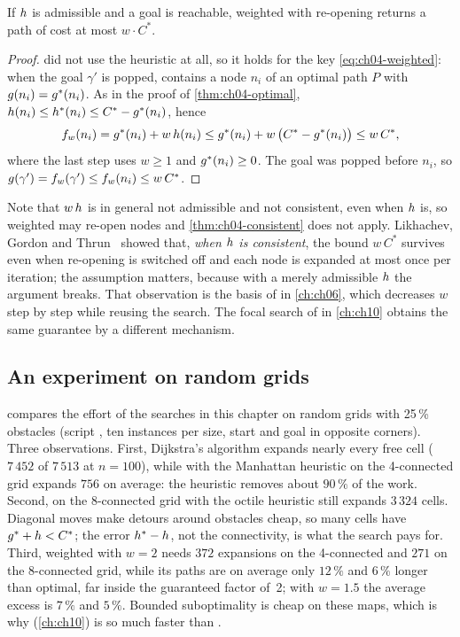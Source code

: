 \begin{theorem}
\label{thm:ch04-weighted}
If $h$ is admissible and a goal is reachable, weighted \astar with
re-opening returns a path of cost at most $w \cdot C^*$.
\end{theorem}
\begin{proof}
 did not use the heuristic at all, so it holds for
the key \cref{eq:ch04-weighted}: when the goal $\gamma'$ is popped, \Open
contains a node $n_i$ of an optimal path $P$ with $g(n_i) =
g^*(n_i)$. As in the proof of \cref{thm:ch04-optimal},
$h(n_i) \le h^*(n_i) \le C^* - g^*(n_i)$, hence
\[
  f_w(n_i) = g^*(n_i) + w\,h(n_i)
    \le g^*(n_i) + w\,\bigl(C^* - g^*(n_i)\bigr)
    \le w\,C^*,
\]
where the last step uses $w \ge 1$ and $g^*(n_i) \ge 0$. The goal was
popped before $n_i$, so $g(\gamma') = f_w(\gamma') \le f_w(n_i)
\le w\,C^*$.
\end{proof}

Note that $w\,h$ is in general not admissible and not consistent, even
when $h$ is, so weighted \astar may re-open nodes and \cref{thm:ch04-consistent}
does not apply. Likhachev, Gordon and Thrun~\cite{likhachev2003ara} showed
that, \emph{when $h$ is consistent}, the bound $w\,C^*$ survives even
when re-opening is switched off and each node is expanded at most once per
iteration; the assumption matters, because with a merely admissible $h$
the argument breaks. That observation is the basis of \arastar in \cref{ch:ch06}, which decreases
$w$ step by step while reusing the search. The focal search of \ecbs in
\cref{ch:ch10} obtains the same guarantee by a different mechanism.

\subsection{An experiment on random grids}
\label{sec:ch04-experiment}

 compares the effort of the searches in this chapter on
random grids with 25\,\% obstacles (script ,
ten instances per size, start and goal in opposite corners). Three
observations. First, Dijkstra's algorithm expands nearly every free cell
($7\,452$ of $7\,513$ at $n = 100$), while \astar with the Manhattan
heuristic on the 4-connected grid expands $756$ on average: the heuristic
removes about $90\,\%$ of the work. Second, on the 8-connected grid \astar
with the octile heuristic still expands $3\,324$ cells. Diagonal moves make
detours around obstacles cheap, so many cells have $g^* + h <
C^*$; the error $h^* - h$, not the connectivity, is what the search
pays for. Third, weighted \astar with $w = 2$ needs $372$ expansions on the
4-connected and $271$ on the 8-connected grid, while its paths are on average
only $12\,\%$ and $6\,\%$ longer than optimal, far inside the guaranteed factor
of~2; with $w = 1.5$ the average excess is $7\,\%$ and $5\,\%$. Bounded
suboptimality is cheap on these maps, which is why \ecbs (\cref{ch:ch10}) is
so much faster than \cbs.

